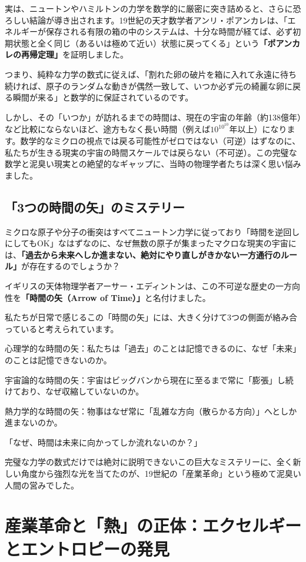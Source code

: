 実は、ニュートンやハミルトンの力学を数学的に厳密に突き詰めると、さらに恐ろしい結論が導き出されます。19世紀の天才数学者アンリ・ポアンカレは、「エネルギーが保存される有限の箱の中のシステムは、十分な時間が経てば、必ず初期状態と全く同じ（あるいは極めて近い）状態に戻ってくる」という\textbf{「ポアンカレの再帰定理」}を証明しました。

つまり、純粋な力学の数式に従えば、「割れた卵の破片を箱に入れて永遠に待ち続ければ、原子のランダムな動きが偶然一致して、いつか必ず元の綺麗な卵に戻る瞬間が来る」と数学的に保証されているのです。

しかし、その「いつか」が訪れるまでの時間は、現在の宇宙の年齢（約138億年）など比較にならないほど、途方もなく長い時間（例えば\(10^{10^{10}}\)年以上）になります。数学的なミクロの視点では戻る可能性がゼロではない（可逆）はずなのに、私たちが生きる現実の宇宙の時間スケールでは戻らない（不可逆）。この完璧な数学と泥臭い現実との絶望的なギャップに、当時の物理学者たちは深く思い悩みました。

\subsection{「3つの時間の矢」のミステリー}

ミクロな原子や分子の衝突はすべてニュートン力学に従っており「時間を逆回しにしてもOK」なはずなのに、なぜ無数の原子が集まったマクロな現実の宇宙には、\textbf{「過去から未来へしか進まない、絶対にやり直しがきかない一方通行のルール」}が存在するのでしょうか？

イギリスの天体物理学者アーサー・エディントンは、この不可逆な歴史の一方向性を\textbf{「時間の矢（Arrow of Time）」}と名付けました。

私たちが日常で感じるこの「時間の矢」には、大きく分けて3つの側面が絡み合っていると考えられています。

心理学的な時間の矢：私たちは「過去」のことは記憶できるのに、なぜ「未来」のことは記憶できないのか。

宇宙論的な時間の矢：宇宙はビッグバンから現在に至るまで常に「膨張」し続けており、なぜ収縮していないのか。

熱力学的な時間の矢：物事はなぜ常に「乱雑な方向（散らかる方向）」へとしか進まないのか。

「なぜ、時間は未来に向かってしか流れないのか？」

完璧な力学の数式だけでは絶対に説明できないこの巨大なミステリーに、全く新しい角度から強烈な光を当てたのが、19世紀の「産業革命」という極めて泥臭い人間の営みでした。

\section{産業革命と「熱」の正体：エクセルギーとエントロピーの発見}

